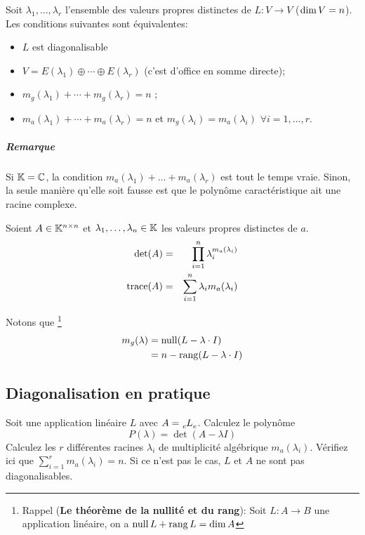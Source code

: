 \begin{myprop}
	Soit $\lambda_1 , \dots , \lambda_r$ l'ensemble des valeurs propres distinctes de $L : V \rightarrow V$ ($\operatorname{dim} V = n$).
	Les conditions suivantes sont équivalentes:
	\begin{itemize}
		\item $L$ est diagonalisable
		\item $V = E(\lambda_1) \oplus \cdots \oplus E(\lambda_r)$ (c'est d'office en somme directe);
		\item $m_g(\lambda_1) + \cdots + m_g(\lambda_r) = n$ ;
		\item $m_a (\lambda_1) + \cdots + m_a (\lambda_r) = n$ et $m_g(\lambda_i) = m_a (\lambda_i)$ $\forall i = 1, \dots, r$.
	\end{itemize}
	\subparagraph{Remarque}
	Si $\mathbb{K} = \mathbb{C}$, la condition $m_a(\lambda_1) + \dots + m_a(\lambda_r)$ est tout le temps vraie.
	Sinon, la seule manière qu'elle soit fausse est que le polynôme caractéristique ait une racine complexe.
\end{myprop}

\begin{myprop}
	Soient $A \in \mathbb{K}^{n \times n}$ et $\lambda_1, \dots, \lambda_n \in \mathbb{K}$ les valeurs propres distinctes de $a$.
	\begin{eqnarray*}
		\det(A) &=& \prod_{i = 1}^{n} \lambda_i^{m_a(\lambda_i)}\\
		\operatorname{trace}(A) &=& \sum_{i = 1}^{n} \lambda_i m_a(\lambda_i)
	\end{eqnarray*}
\end{myprop}

\begin{myrem}
	Notons que
	\footnote{Rappel ({\bf Le théorème de la nullité et du rang}):
	Soit $L:A \to B$ une application linéaire, on a $\operatorname{null} L + \operatorname{rang} L = \dim A$}
	\begin{align*}
		m_g(\lambda) & = \operatorname{null} (L - \lambda \cdot I) \\
		& = n - \operatorname{rang} (L - \lambda \cdot I)
	\end{align*}
\end{myrem}

\subsection{Diagonalisation en pratique}
Soit une application linéaire $L$ avec $A = \tensor*[_e]{L}{_e}$.
Calculez le polynôme
\[ P(\lambda) = \det \left( A - \lambda I \right) \]
Calculez les $r$ différentes racines $\lambda_i$ de multiplicité algébrique $m_a(\lambda_i)$.
Vérifiez ici que $\sum_{i=1}^r m_a(\lambda_i) = n$. Si ce n'est pas le cas, $L$ et $A$ ne sont pas diagonalisables.

